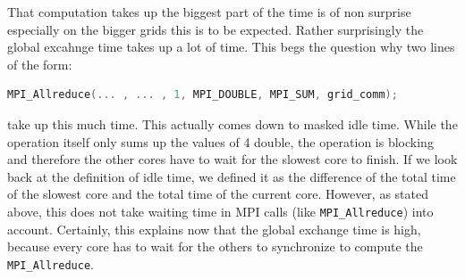 That computation takes up the biggest part of the time is of non surprise especially on the bigger grids this is to be expected. Rather surprisingly the global excahnge time takes up a lot of time. This begs the question why two lines of the form:
\begin{lstlisting}[language=c]
MPI_Allreduce(... , ... , 1, MPI_DOUBLE, MPI_SUM, grid_comm);
\end{lstlisting}
take up this much time. This actually comes down to masked idle time. While the operation itself only sums up the values of 4 double, the operation is blocking and therefore the other cores have to wait for the slowest core to finish. If we look back at the definition of idle time, we defined it as the difference of the total time of the slowest core and the total time of the current core. However, as stated above, this does not take waiting time in MPI calls (like \texttt{MPI\_Allreduce}) into account. Certainly, this explains now that the global exchange time is high, because every core has to wait for the others to synchronize to compute the \texttt{MPI\_Allreduce}.\\
